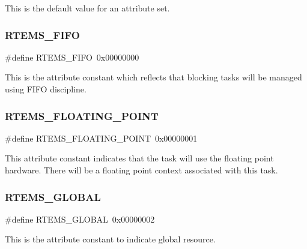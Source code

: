 This is the default value for an attribute set. \mbox{\label{group__ClassicAttributes_gabff683ea2ab213fbfcf31290fce611dc}} 
\subsubsection{\texorpdfstring{RTEMS\_FIFO}{RTEMS\_FIFO}}
{\footnotesize\ttfamily \#define R\+T\+E\+M\+S\+\_\+\+F\+I\+FO~0x00000000}

This is the attribute constant which reflects that blocking tasks will be managed using F\+I\+FO discipline. \mbox{\label{group__ClassicAttributes_gac0368fd84c0d3e0f969d72afc5126881}} 
\subsubsection{\texorpdfstring{RTEMS\_FLOATING\_POINT}{RTEMS\_FLOATING\_POINT}}
{\footnotesize\ttfamily \#define R\+T\+E\+M\+S\+\_\+\+F\+L\+O\+A\+T\+I\+N\+G\+\_\+\+P\+O\+I\+NT~0x00000001}

This attribute constant indicates that the task will use the floating point hardware. There will be a floating point context associated with this task. \mbox{\label{group__ClassicAttributes_ga2c0c459a320511d71b3390e916a1d3f0}} 
\subsubsection{\texorpdfstring{RTEMS\_GLOBAL}{RTEMS\_GLOBAL}}
{\footnotesize\ttfamily \#define R\+T\+E\+M\+S\+\_\+\+G\+L\+O\+B\+AL~0x00000002}

This is the attribute constant to indicate global resource. \mbox{\label{group__ClassicAttributes_ga35ec5908dc2f9b27ea1e273fa3ce79a1}} 
